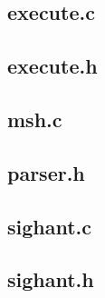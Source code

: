 \documentclass[a4paper, 12pt]{article}
\begin{document}
\subsection{execute.c}\label{execute.c}
\begin{scriptsize}
  
\end{scriptsize}

\subsection{execute.h}\label{execute.h}
\begin{scriptsize}
  
\end{scriptsize}

\subsection{msh.c}\label{msh.c}
\begin{scriptsize}
  
\end{scriptsize}

\subsection{parser.h}\label{parser.h}
\begin{scriptsize}
  
\end{scriptsize}

\subsection{sighant.c}\label{sighant.c}
\begin{scriptsize}
  
\end{scriptsize}

\subsection{sighant.h}\label{sighant.h}
\begin{scriptsize}
  
\end{scriptsize}
\end{document}
